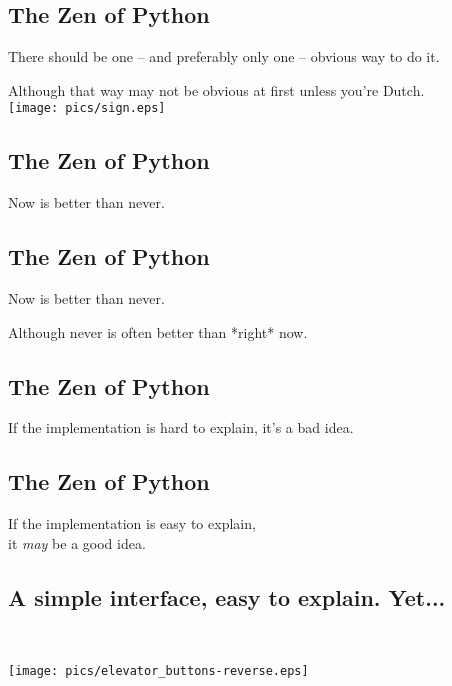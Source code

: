 \documentclass[xga]{xdvislides}
\begin{document}
\subsection{The Zen of Python}
\begin{center}
    There should be one -- and preferably only one -- obvious way to do it.

\addvspace{.5in}

    Although that way may not be obvious at first unless you're Dutch. \\
\vspace*{\fill}
	\texttt{[image: pics/sign.eps]}
\end{center}


\subsection{The Zen of Python}
\begin{center}
    Now is better than never.
\end{center}

\subsection{The Zen of Python}
\begin{center}
    Now is better than never.  \\

\addvspace{.5in}

    Although never is often better than *right* now.
\end{center}

\subsection{The Zen of Python}
\begin{center}
    If the implementation is hard to explain, it's a bad idea.
\end{center}

\subsection{The Zen of Python}
\begin{center}
    If the implementation is easy to explain, \\
	it {\em may} be a good idea.
\end{center}

\subsection{A simple interface, easy to explain.  Yet...}
\\
\vspace*{\fill}
\begin{center}
	\texttt{[image: pics/elevator\_buttons-reverse.eps]}
\end{center}
\vspace*{\fill}
\end{document}
